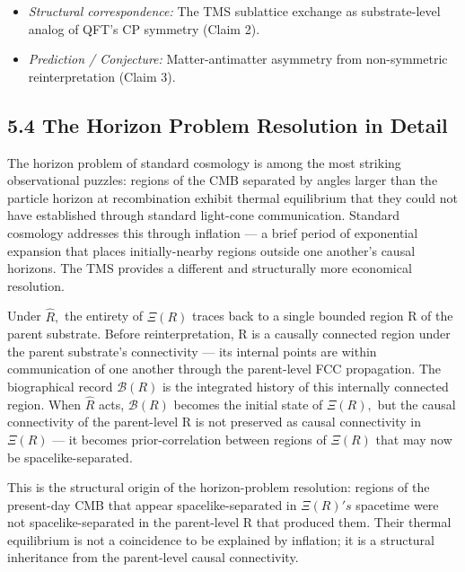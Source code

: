 \documentclass[11pt,oneside]{report}
\theoremstyle{definition}
\theoremstyle{remark}
\begin{document}
\begin{itemize}
\item
  \emph{Structural correspondence:} The TMS sublattice exchange as
  substrate-level analog of QFT's CP symmetry (Claim 2).
\end{itemize}

\begin{itemize}
\item
  \emph{Prediction / Conjecture:} Matter-antimatter asymmetry from
  non-symmetric reinterpretation (Claim 3).
\end{itemize}

\subsection*{5.4 The Horizon Problem Resolution in Detail}

The horizon problem of standard cosmology is among the most striking
observational puzzles: regions of the CMB separated by angles larger
than the particle horizon at recombination exhibit thermal equilibrium
that they could not have established through standard light-cone
communication. Standard cosmology addresses this through inflation --- a
brief period of exponential expansion that places initially-nearby
regions outside one another's causal horizons. The TMS provides a
different and structurally more economical resolution.

Under \ensuremath{\hat{R},} the entirety of \ensuremath{\Xi (R)} traces back to a single bounded region R
of the parent substrate. Before reinterpretation, R is a causally
connected region under the parent substrate's connectivity --- its
internal points are within communication of one another through the
parent-level FCC propagation. The biographical record \ensuremath{\mathcal{B}(R)} is the
integrated history of this internally connected region. When \ensuremath{\hat{R}} acts,
\ensuremath{\mathcal{B}(R)} becomes the initial state of \ensuremath{\Xi (R),} but the causal connectivity of
the parent-level R is not preserved as causal connectivity in \ensuremath{\Xi (R)} ---
it becomes prior-correlation between regions of \ensuremath{\Xi (R)} that may now be
spacelike-separated.

This is the structural origin of the horizon-problem resolution: regions
of the present-day CMB that appear spacelike-separated in \ensuremath{\Xi (R)'s}
spacetime were not spacelike-separated in the parent-level R that
produced them. Their thermal equilibrium is not a coincidence to be
explained by inflation; it is a structural inheritance from the
parent-level causal connectivity.
\end{document}
